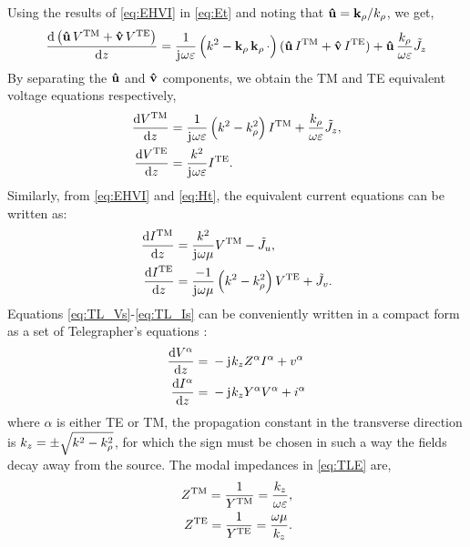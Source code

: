 \documentclass[12pt]{article}
\begin{document}
%
Using the results of \eqref{eq:EHVI} in \eqref{eq:Et} and noting that $\mathbf{\hat u} = \mathbf{k}_{\rho}/k_{\rho}$, we get,
%
\begin{equation}
  \dv{\left(\mathbf{\hat u} \, V^{\mathrm{TM}} + \mathbf{\hat v} \,V^{\mathrm{TE}} \right)}{z} = \frac{1}{\mathrm{j}\mkern1mu \omega \varepsilon}\left( k^2 - \mathbf{k}_{\rho} \,\mathbf{k}_{\rho}
  \,\cdot \right) (\mathbf{\hat u}\, I^{\mathrm{TM}} +
  \mathbf{\hat v} \, I^{\mathrm{TE}}) + \mathbf{\hat u} \, \frac{k_{\rho}}{\omega \varepsilon} \tilde{J}_z
  \label{eq:Vinuv}
\end{equation}
%
By separating the $\mathbf{\hat u}$ and $\mathbf{\hat v}$ components, we obtain the TM and TE equivalent voltage equations respectively,
%
\begin{subequations}
  \begin{align}
    \dv{V^{\mathrm{TM}}}{z} ={}&
    \frac{1}{\mathrm{j}\mkern1mu \omega \varepsilon}\left( k^2 - k_{\rho}^2 \right)I^{\mathrm{TM}} + \frac{k_{\rho}}{\omega \varepsilon} \tilde{J}_z,
    \label{eq:V_TM}\\
    \dv{V^{\mathrm{TE}}}{z} ={}&
    \frac{k^2}{\mathrm{j}\mkern1mu \omega \varepsilon} I^{\mathrm{TE}}.
    \label{eq:V_TE}
  \end{align}
  \label{eq:TL_Vs}%
\end{subequations}
%
Similarly, from \eqref{eq:EHVI} and \eqref{eq:Ht}, the equivalent current equations can be written as:
%
\begin{subequations}
  \begin{align}
    \dv{I^{\mathrm{TM}}}{z} ={}&
    \frac{k^2}{\mathrm{j}\mkern1mu \omega \mu} V^{\mathrm{TM}} - \tilde{J}_u,
    \label{eq:I_TM}\\
    \dv{I^{\mathrm{TE}}}{z} ={}&
    \frac{-1}{\mathrm{j}\mkern1mu \omega \mu}\left( k^2 - k_{\rho}^2 \right)V^{\mathrm{TE}} + \tilde{J}_v.
    \label{eq:I_TE}
  \end{align}
  \label{eq:TL_Is}%
\end{subequations}
%
Equations \eqref{eq:TL_Vs}-\eqref{eq:TL_Is} can be conveniently written in a compact form as a set of Telegrapher's equations \cite[p. 190]{felson}:
%
\begin{subequations}
  \begin{align}
    \dv{V^{\alpha}}{z} ={}& -\mathrm{j}\mkern1mu k_z Z^{\alpha}I^{\alpha} + v^{\alpha}
    \label{eq:TL_V}\\
    \dv{I^{\alpha}}{z} ={}& -\mathrm{j}\mkern1mu k_z Y^{\alpha}V^{\alpha} + i^{\alpha}
    \label{eq:TL_I}
  \end{align}
  \label{eq:TLE}%
\end{subequations}
%
where $\alpha$ is either TE or TM, the propagation constant in the transverse direction is $k_z = \pm \sqrt{k^2 - k_{\rho}^2}$, for which the sign must be chosen in such a way the fields decay away from the source. The modal impedances in \eqref{eq:TLE} are,
%
\begin{subequations}
  \begin{align}
    Z^{\mathrm{TM}} = \frac{1}{Y^{\mathrm{TM}}} = \frac{k_z}{\omega \varepsilon},
    \label{eq:z_TM}\\
    Z^{\mathrm{TE}} = \frac{1}{Y^{\mathrm{TE}}} = \frac{\omega \mu}{k_z}.
    \label{eq:z_TE}
  \end{align}
  \label{eq:Z}%
\end{subequations}
%
\end{document}
